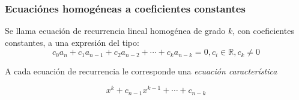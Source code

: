 \documentclass[a4paper, twoside]{article}
\begin{document}
\subsubsection{Ecuaciónes homogéneas a coeficientes constantes}
Se llama ecuación de recurrencia lineal homogénea de grado $k$, con coeficientes constantes, a una expresión del tipo:
\begin{equation*}
	c_0 a_n + c_1 a_{n-1} + c_2 a_{n-2} + \cdots + c_k a_{n-k} = 0 ,c_i \in \mathbb{R} , c_k \ne 0
\end{equation*}

A cada ecuación de recurrencia le corresponde una \emph{ecuación característica}

\begin{equation*}
	x^k + c_{n-1} x^{k-1} + \cdots + c_{n-k}
\end{equation*}
\end{document}
